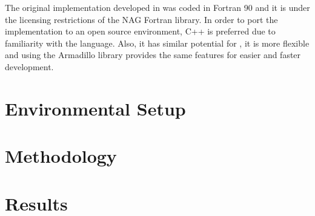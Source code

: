 \documentclass[../thesis]{subfiles}
\begin{document}
	The original implementation developed in \cite{Deadman:Higham:Ralha:2013} was coded in Fortran 90 and it is under the licensing restrictions of the NAG Fortran library. In order to port the implementation to an open source environment, C++ is preferred due to familiarity with the language. Also, it has similar potential for \hpc, it is more flexible and using the Armadillo library provides the same features for easier and faster development.

	
	
	
	

	\section{Environmental Setup}

	\section{Methodology}

	\section{Results}
\end{document}
